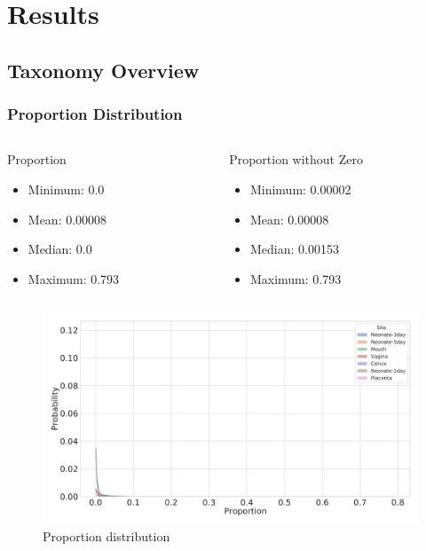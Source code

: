 \documentclass{beamer}
\begin{document}
    \section{Results}
    \subsection{Taxonomy Overview}
    \begin{frame}
        \frametitle{Proportion Distribution}

        \begin{columns}
            \begin{column}{0.4 \linewidth}
                \begin{block}{Proportion}
                    \begin{itemize}
                        \item Minimum: 0.0
                        \item Mean: 0.00008
                        \item Median: 0.0
                        \item Maximum: 0.793
                    \end{itemize}
                \end{block}
            \end{column}

            \begin{column}{0.4 \linewidth}
                \begin{block}{Proportion without Zero}
                    \begin{itemize}
                        \item Minimum: 0.00002
                        \item Mean: 0.00008
                        \item Median: 0.00153
                        \item Maximum: 0.793
                    \end{itemize}
                \end{block}
            \end{column}
        \end{columns}

        \begin{figure}
            \includegraphics[width=0.5 \linewidth]{figures/Step53_Proportion/everything.DADA2.homd.uncorrected.pdf}
            \caption{Proportion distribution}
        \end{figure}
    \end{frame}
\end{document}
